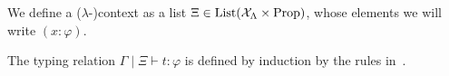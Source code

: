 \documentclass[a4paper,UKenglish,cleveref, autoref, thm-restate]{lipics-v2021}
\begin{document}
\begin{definition}
  We define a ($\lambda$-)context as a list $\Xi \in \mathrm{List}(\mathcal{X}_\Lambda \times \mathrm{Prop})$, whose elements we will write $(x : \varphi)$.

  The typing relation $\Gamma\mid \Xi \vdash t : \varphi$ is defined by induction by the rules in~.

\end{definition}
\begin{figure}[t]

  \begin{mathpar}












\end{mathpar}
\end{figure}
\end{document}
